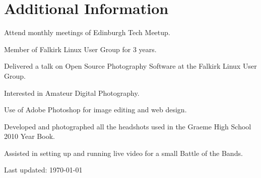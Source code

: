 \documentclass[11pt,a4paper]{article}
\renewenvironment{itemize}{
  \begin{list}{}{
    \setlength{\leftmargin}{1em}
    \setlength{\itemsep}{0.25em}
    \setlength{\parskip}{0pt}
    \setlength{\parsep}{0.25em}
    \renewcommand{\labelitemi}{$\bullet$}
  }
}{
  \end{list}
}
\begin{document}
\section*{Additional Information}

\begin{itemize}
    \item Attend monthly meetings of Edinburgh Tech Meetup.
    \item Member of Falkirk Linux User Group for 3 years.
    \item Delivered a talk on Open Source Photography Software at the Falkirk
        Linux User Group.
    \item Interested in Amateur Digital Photography.
    \item Use of Adobe Photoshop for image editing and web design.
    \item Developed and photographed all the headshots used in the Graeme High
        School 2010 Year Book.
    \item Assisted in setting up and running live video for a small Battle of
        the Bands.
\end{itemize}


\medskip
\begin{center}
  \begin{small}
    Last updated: \today
  \end{small}
\end{center}
\end{document}

